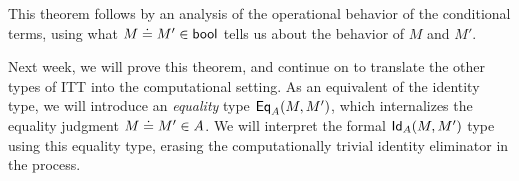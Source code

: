 \documentclass{article}
\begin{document}
This theorem follows by an analysis of the operational behavior of the
conditional terms, using what $\hasEEC{M}{M'}{\bool}$ tells us about the
behavior of $M$ and $M'$.

Next week, we will prove this theorem, and continue on to translate the other
types of ITT into the computational setting. As an equivalent of the identity
type, we will introduce an \emph{equality} type $\mathsf{Eq}_{A}(M,M')$, which
internalizes the equality judgment $\hasEEC{M}{M'}{A}$. We will interpret the
formal $\mathsf{Id}_{A}(M,M')$ type using this equality type, erasing the
computationally trivial identity eliminator in the process.



\end{document}
